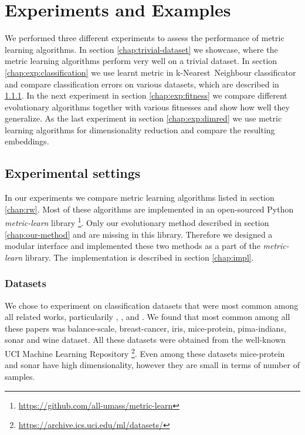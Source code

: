 \documentclass[12pt,a4paper]{report}
\begin{document}

\chapter{Experiments and Examples}
We performed three different experiments to assess the performance of metric learning algorithms. In section \ref{chap:trivial-dataset} we showcase, where the metric learning algorithms perform very well on a trivial dataset. In section \ref{chap:exp:classification} we use learnt metric in k-Nearest~Neighbour classificator and compare classification errors on various datasets, which are described in \ref{chap:exp:datasets}. In the next experiment in section \ref{chap:exp:fitness} we compare different evolutionary algorithms together with various fitnesses and show how well they generalize. As the last experiment in section \ref{chap:exp:dimred} we use metric learning algorithms for dimensionality reduction and compare the resulting embeddings.

\section{Experimental settings} 
In our experiments we compare metric learning algorithms listed in section \ref{chap:rw}. Most of these algorithms are implemented in an open-sourced Python \textit{metric-learn} library \footnote{\url{https://github.com/all-umass/metric-learn}}. Only our evolutionary method described in section \ref{chap:our-method} and \cite{fukui2013evolutionary} are missing in this library. Therefore we designed a modular interface and implemented these two methods as a part of the \textit{metric-learn} library. The~implementation is described in section \ref{chap:impl}.

\subsection{Datasets} \label{chap:exp:datasets}
We chose to experiment on classification datasets that were most common among all related works, particularily \cite{xing2002distance}, \cite{weinberger2009distance}, \cite{jacobgoldberger2004neighbourhood} and \cite{fukui2013evolutionary}. We found that most common among all these papers was balance-scale, breast-cancer, iris, mice-protein, pima-indians, sonar and wine dataset. All these datasets were obtained from the well-known UCI Machine Learning Repository \footnote{\url{https://archive.ics.uci.edu/ml/datasets/}}. Even among these datasets mice-protein and sonar  have high dimensionality, however they are small in terms of number of samples.
\end{document}

